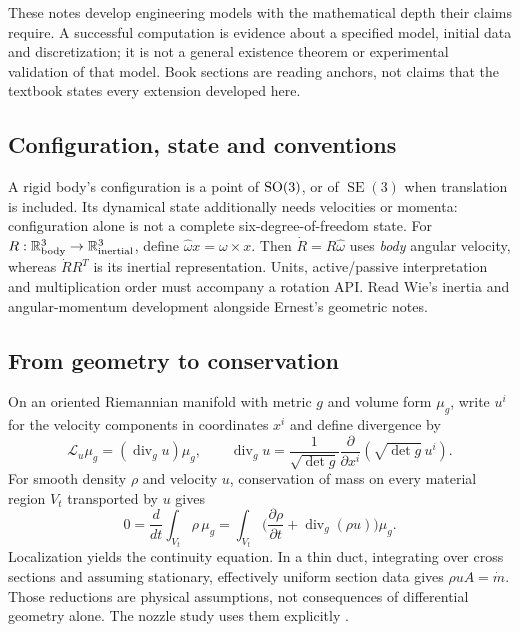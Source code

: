 
These notes develop engineering models with the mathematical depth their claims
require. A successful computation is evidence about a specified model, initial
data and discretization; it is not a general existence theorem or experimental
validation of that model. Book sections are reading anchors, not claims that the
textbook states every extension developed here.

\subsection{Configuration, state and conventions}
A rigid body's configuration is a point of $\operatorname{SO}(3)$, or of $\operatorname{SE}(3)$
when translation is included. Its dynamical state additionally needs velocities
or momenta: configuration alone is not a complete six-degree-of-freedom state.
For $R:\mathbb{R}^3_{\rm body}\to\mathbb{R}^3_{\rm inertial}$, define
$\widehat\omega x=\omega\times x$. Then $\dot R=R\widehat\omega$ uses
\emph{body} angular velocity, whereas $\dot RR^T$ is its inertial representation.
Units, active/passive interpretation and multiplication order must accompany a
rotation API. Read Wie's inertia and angular-momentum development
\cite[Sections 6.1--6.4]{wie} alongside Ernest's geometric notes.

\subsection{From geometry to conservation}
On an oriented Riemannian manifold with metric $g$ and volume form $\mu_g$,
write $u^i$ for the velocity components in coordinates $x^i$ and define
divergence by
\[
 \mathcal L_u\mu_g=(\operatorname{div}_g u)\mu_g,
 \qquad
 \operatorname{div}_g u=\frac{1}{\sqrt{\det g}}
   \frac{\partial}{\partial x^i}\!\left(\sqrt{\det g}\,u^i\right).
\]
For smooth density $\rho$ and velocity $u$, conservation of mass on every
material region $V_t$ transported by $u$ gives
\[
 0=\frac{d}{dt}\int_{V_t}\rho\,\mu_g
   =\int_{V_t}\bigl(\frac{\partial\rho}{\partial t}+\operatorname{div}_g(\rho u)\bigr)\mu_g.
\]
Localization yields the continuity equation. In a thin duct, integrating over
cross sections and assuming stationary, effectively uniform section data gives
$\rho u A=\dot m$. Those reductions are physical assumptions, not consequences
of differential geometry alone. The nozzle study uses them explicitly
\cite[Sections 3.2--3.3]{sutton}.

